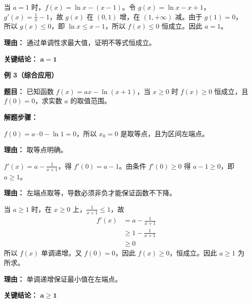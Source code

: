 \begin{examplebox}
\begin{description}[style=nextline, leftmargin=2.8em, labelsep=0.5em, itemsep=0.45em]
		\item[\textbf{第三步（充分性验证）：}] 当 $a=1$ 时，$f(x)=\ln x - (x-1)$。令 $g(x)=\ln x - x +1$，$g'(x)=\frac{1}{x}-1$，故 $g(x)$ 在 $(0,1)$ 增，在 $(1,+\infty)$ 减。由于 $g(1)=0$，所以 $g(x)\le 0$，即 $\ln x \le x-1$，所以 $f(x)\le0$ 恒成立。因此 $a=1$。
			\par\textbf{理由：} 通过单调性求最大值，证明不等式恒成立。
	\end{description}

	\textbf{\textcolor{CExample}{关键结论：}}
	$\mathbf{a=1}$

	\medskip
	\textbf{\textcolor{CExample}{例 3（综合应用）}}

	\textbf{\textcolor{CExample}{题目：}}
	已知函数 $f(x)=ax-\ln(x+1)$，当 $x\ge0$ 时 $f(x)\ge0$ 恒成立，且 $f(0)=0$，求实数 $a$ 的取值范围。

	\textbf{\textcolor{CExample}{解题步骤：}}
	\begin{description}[style=nextline, leftmargin=2.8em, labelsep=0.5em, itemsep=0.45em]
		\item[\textbf{第一步（确定取等点）：}] $f(0)=a\cdot0-\ln1=0$，所以 $x_0=0$ 是取等点，且为区间左端点。
			\par\textbf{理由：} 取等点明确。

		\item[\textbf{第二步（端点导数必要条件）：}] $f'(x)=a-\frac{1}{x+1}$，得 $f'(0)=a-1$。由条件 $f'(0)\ge0$ 得 $a-1\ge0$，即 $a\ge1$。
			\par\textbf{理由：} 左端点取等，导数必须非负才能保证函数不下降。

		\item[\textbf{第三步（充分性验证）：}] 当 $a\ge1$ 时，在 $x\ge0$ 上，$\frac{1}{x+1}\le1$，故
			\[
				\begin{aligned}
					f'(x) &= a - \frac{1}{x+1} \\
					&\ge 1 - \frac{1}{x+1} \\
					&\ge 0
			\end{aligned}
			\]
			所以 $f(x)$ 单调递增。又 $f(0)=0$，因此 $f(x)\ge 0$，恒成立。因此 $a\ge1$ 为所求。
			\par\textbf{理由：} 单调递增保证最小值在左端点。
	\end{description}

	\textbf{\textcolor{CExample}{关键结论：}}
	$\mathbf{a\ge 1}$

\end{examplebox}
